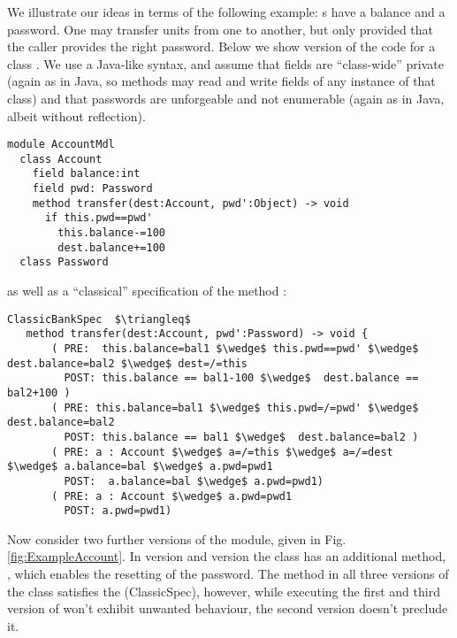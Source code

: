 



We illustrate our ideas in terms of the following example:
s have a balance and a password. One may transfer
 units from one  to another, but only provided
that the caller provides the right password. Below we show version
 of the code for a class .  We use a Java-like
syntax, and assume that fields are ``class-wide'' private (again as in
Java, so methods may read and write fields of any instance of that
class) and that passwords are unforgeable and not enumerable (again as
in Java, albeit without reflection).

 
\begin{lstlisting}[language=Chainmail]
module AccountMdl
  class Account
    field balance:int 
    field pwd: Password
    method transfer(dest:Account, pwd':Object) -> void
      if this.pwd==pwd'
        this.balance-=100
        dest.balance+=100
  class Password
\end{lstlisting}

as well as a ``classical'' specification of the method :



\begin{lstlisting}[mathescape=true, frame=lines, language=Chainmail]
ClassicBankSpec  $\triangleq$
   method transfer(dest:Account, pwd':Password) -> void {
       ( PRE:  this.balance=bal1 $\wedge$ this.pwd==pwd' $\wedge$ dest.balance=bal2 $\wedge$ dest=/=this 
         POST: this.balance == bal1-100 $\wedge$  dest.balance == bal2+100 )
       ( PRE: this.balance=bal1 $\wedge$ this.pwd=/=pwd' $\wedge$ dest.balance=bal2
         POST: this.balance == bal1 $\wedge$  dest.balance=bal2 )
       ( PRE: a : Account $\wedge$ a=/=this $\wedge$ a=/=dest  $\wedge$ a.balance=bal $\wedge$ a.pwd=pwd1
         POST:  a.balance=bal $\wedge$ a.pwd=pwd1)
       ( PRE: a : Account $\wedge$ a.pwd=pwd1  
         POST: a.pwd=pwd1)       
\end{lstlisting}
 
  
 
 Now consider two further versions of the module, given in Fig. \ref{fig:ExampleAccount}.
 In version {} and version {} the  class has an additional method, , which enables the resetting of the password.
The method  in all three versions of the class  satisfies the (ClassicSpec), 
however, while executing the first and third version of  won't exhibit unwanted behaviour, the second version doesn't preclude it.
  
